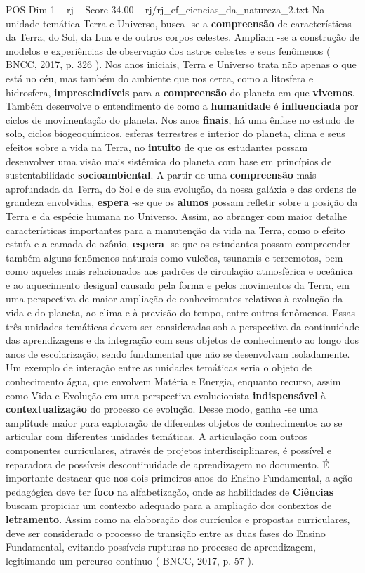 \begin{textsample}{POS Dim 1 – rj – Score 34.00 – rj/rj\_ef\_ciencias\_da\_natureza\_2.txt}
Na unidade temática Terra e Universo, busca -se a \textbf{compreensão} de características da Terra, do Sol, da Lua e de outros corpos celestes.
Ampliam -se a construção de modelos e experiências de observação dos astros celestes e seus fenômenos ( BNCC, 2017, p. 326 ).
Nos anos iniciais, Terra e Universo trata não apenas o que está no céu, mas também do ambiente que nos cerca, como a litosfera e hidrosfera, \textbf{imprescindíveis} para a \textbf{compreensão} do planeta em que \textbf{vivemos}.
Também desenvolve o entendimento de como a \textbf{humanidade} é \textbf{influenciada} por ciclos de movimentação do planeta.
Nos anos \textbf{finais}, há uma ênfase no estudo de solo, ciclos biogeoquímicos, esferas terrestres e interior do planeta, clima e seus efeitos sobre a vida na Terra, no \textbf{intuito} de que os estudantes possam desenvolver uma visão mais sistêmica do planeta com base em princípios de sustentabilidade \textbf{socioambiental}.
A partir de uma \textbf{compreensão} mais aprofundada da Terra, do Sol e de sua evolução, da nossa galáxia e das ordens de grandeza envolvidas, \textbf{espera} -se que os \textbf{alunos} possam refletir sobre a posição da Terra e da espécie humana no Universo.
Assim, ao abranger com maior detalhe características importantes para a manutenção da vida na Terra, como o efeito estufa e a camada de ozônio, \textbf{espera} -se que os estudantes possam compreender também alguns fenômenos naturais como vulcões, tsunamis e terremotos, bem como aqueles mais relacionados aos padrões de circulação atmosférica e oceânica e ao aquecimento desigual causado pela forma e pelos movimentos da Terra, em uma perspectiva de maior ampliação de conhecimentos relativos à evolução da vida e do planeta, ao clima e à previsão do tempo, entre outros fenômenos.
Essas três unidades temáticas devem ser consideradas sob a perspectiva da continuidade das aprendizagens e da integração com seus objetos de conhecimento ao longo dos anos de escolarização, sendo fundamental que não se desenvolvam isoladamente.
Um exemplo de interação entre as unidades temáticas seria o objeto de conhecimento água, que envolvem Matéria e Energia, enquanto recurso, assim como Vida e Evolução em uma perspectiva evolucionista \textbf{indispensável} à \textbf{contextualização} do processo de evolução.
Desse modo, ganha -se uma amplitude maior para exploração de diferentes objetos de conhecimentos ao se articular com diferentes unidades temáticas.
A articulação com outros componentes curriculares, através de projetos interdisciplinares, é possível e reparadora de possíveis descontinuidade de aprendizagem no documento.
É importante destacar que nos dois primeiros anos do Ensino Fundamental, a ação pedagógica deve ter \textbf{foco} na alfabetização, onde as habilidades de \textbf{Ciências} buscam propiciar um contexto adequado para a ampliação dos contextos de \textbf{letramento}.
Assim como na elaboração dos currículos e propostas curriculares, deve ser considerado o processo de transição entre as duas fases do Ensino Fundamental, evitando possíveis rupturas no processo de aprendizagem, legitimando um percurso contínuo ( BNCC, 2017, p. 57 ).


\end{textsample}
